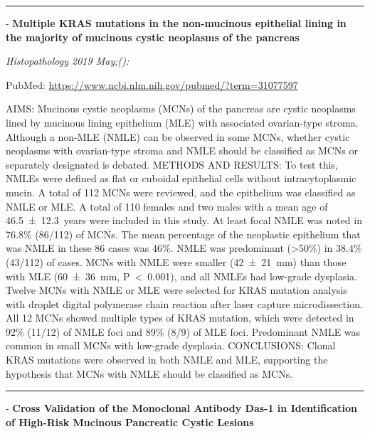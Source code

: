 \documentclass[]{article}
\begin{document}
{}

{}

\begin{center}\rule{0.5\linewidth}{\linethickness}\end{center}

 - \textbf{Multiple KRAS mutations in the non-mucinous epithelial lining
in the majority of mucinous cystic neoplasms of the pancreas}

\emph{Histopathology 2019 May;():}

PubMed: \url{https://www.ncbi.nlm.nih.gov/pubmed/?term=31077597}

AIMS: Mucinous cystic neoplasms (MCNs) of the pancreas are cystic
neoplasms lined by mucinous lining epithelium (MLE) with associated
ovarian-type stroma. Although a non-MLE (NMLE) can be observed in some
MCNs, whether cystic neoplasms with ovarian-type stroma and NMLE should
be classified as MCNs or separately designated is debated. METHODS AND
RESULTS: To test this, NMLEs were defined as flat or cuboidal epithelial
cells without intracytoplasmic mucin. A total of 112 MCNs were reviewed,
and the epithelium was classified as NMLE or MLE. A total of 110 females
and two males with a mean age of 46.5~±~12.3~years were included in this
study. At least focal NMLE was noted in 76.8\% (86/112) of MCNs. The
mean percentage of the neoplastic epithelium that was NMLE in these 86
cases was 46\%. NMLE was predominant (\textgreater{}50\%) in 38.4\%
(43/112) of cases. MCNs with NMLE were smaller (42~±~21~mm) than those
with MLE (60~±~36~mm, P~\textless{}~0.001), and all NMLEs had low-grade
dysplasia. Twelve MCNs with NMLE or MLE were selected for KRAS mutation
analysis with droplet digital polymerase chain reaction after laser
capture microdissection. All 12 MCNs showed multiple types of KRAS
mutation, which were detected in 92\% (11/12) of NMLE foci and 89\%
(8/9) of MLE foci. Predominant NMLE was common in small MCNs with
low-grade dysplasia. CONCLUSIONS: Clonal KRAS mutations were observed in
both NMLE and MLE, supporting the hypothesis that MCNs with NMLE should
be classified as MCNs.

{}

{}

\begin{center}\rule{0.5\linewidth}{\linethickness}\end{center}

 - \textbf{Cross Validation of the Monoclonal Antibody Das-1 in
Identification of High-Risk Mucinous Pancreatic Cystic Lesions}
\end{document}
